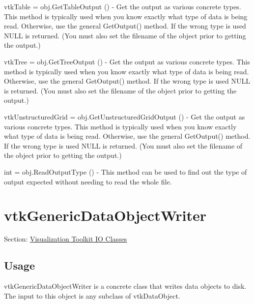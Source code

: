 \begin{DoxyItemize}
\item {\ttfamily vtk\-Table = obj.\-Get\-Table\-Output ()} -\/ Get the output as various concrete types. This method is typically used when you know exactly what type of data is being read. Otherwise, use the general Get\-Output() method. If the wrong type is used N\-U\-L\-L is returned. (You must also set the filename of the object prior to getting the output.)  
\item {\ttfamily vtk\-Tree = obj.\-Get\-Tree\-Output ()} -\/ Get the output as various concrete types. This method is typically used when you know exactly what type of data is being read. Otherwise, use the general Get\-Output() method. If the wrong type is used N\-U\-L\-L is returned. (You must also set the filename of the object prior to getting the output.)  
\item {\ttfamily vtk\-Unstructured\-Grid = obj.\-Get\-Unstructured\-Grid\-Output ()} -\/ Get the output as various concrete types. This method is typically used when you know exactly what type of data is being read. Otherwise, use the general Get\-Output() method. If the wrong type is used N\-U\-L\-L is returned. (You must also set the filename of the object prior to getting the output.)  
\item {\ttfamily int = obj.\-Read\-Output\-Type ()} -\/ This method can be used to find out the type of output expected without needing to read the whole file.  
\end{DoxyItemize}\hypertarget{vtkio_vtkgenericdataobjectwriter}{}\section{vtk\-Generic\-Data\-Object\-Writer}\label{vtkio_vtkgenericdataobjectwriter}
Section\-: \hyperlink{sec_vtkio}{Visualization Toolkit I\-O Classes} \hypertarget{vtkwidgets_vtkxyplotwidget_Usage}{}\subsection{Usage}\label{vtkwidgets_vtkxyplotwidget_Usage}
vtk\-Generic\-Data\-Object\-Writer is a concrete class that writes data objects to disk. The input to this object is any subclass of vtk\-Data\-Object.

